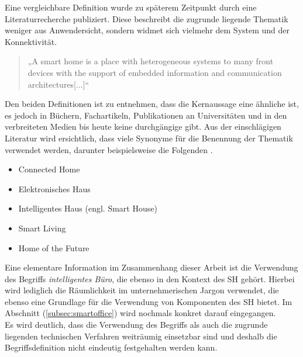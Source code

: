     Eine vergleichbare Definition wurde zu späterem Zeitpunkt durch eine Literaturrecherche publiziert. Diese beschreibt 
    die zugrunde liegende Thematik weniger aus Anwendersicht, sondern widmet sich vielmehr dem System und der Konnektivität. 
    \begin{quote}
        „A smart home is a place with heterogeneous systems to many
        front devices with the support of embedded information and
        communication architectures[...]“ \cite{Balakrishnan2018}
    \end{quote}
    Den beiden Definitionen ist zu entnehmen, dass die Kernaussage eine ähnliche ist, es jedoch in Büchern, Fachartikeln, 
    Publikationen an Universitäten und in den verbreiteten Medien bis heute keine durchgängige gibt. Aus der 
    einschlägigen Literatur wird ersichtlich, dass viele Synonyme für die Benennung der Thematik verwendet werden, darunter 
    beispielsweise die Folgenden \cite{strese.2010m}.
    \\
    \linebreak
    \pagebreak
    \begin{itemize}
        \item Connected Home
        \item Elektronisches Haus
        \item Intelligentes Haus (engl. Smart House)
        \item Smart Living
        \item Home of the Future 
    \end{itemize}
    Eine elementare Information im Zusammenhang dieser Arbeit ist die Verwendung des Begriffs \textit{intelligentes Büro}, die 
    ebenso in den Kontext des \acl{SH} gehört. Hierbei wird lediglich die Räumlichkeit im unternehmerischen Jargon verwendet, 
    die ebenso eine Grundlage für die Verwendung von Komponenten des \acl{SH} bietet. Im Abschnitt (\ref{subsec:smartoffice}) wird 
    nochmals konkret darauf eingegangen.
    \\
    Es wird deutlich, dass die Verwendung des Begriffs als auch die zugrunde liegenden technischen Verfahren 
    weiträumig einsetzbar sind und deshalb die Begriffsdefinition nicht eindeutig festgehalten werden kann. 
    
